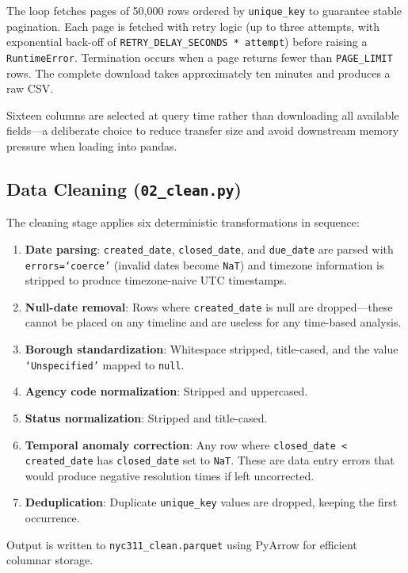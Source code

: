 The loop fetches pages of 50,000 rows ordered by \texttt{unique\_key} to guarantee stable pagination. Each page is fetched with retry logic (up to three attempts, with exponential back-off of \texttt{RETRY\_DELAY\_SECONDS * attempt}) before raising a \texttt{RuntimeError}. Termination occurs when a page returns fewer than \texttt{PAGE\_LIMIT} rows. The complete download takes approximately ten minutes and produces a raw CSV.

Sixteen columns are selected at query time rather than downloading all available fields---a deliberate choice to reduce transfer size and avoid downstream memory pressure when loading into pandas.

\subsection{Data Cleaning (\texttt{02\_clean.py})}

The cleaning stage applies six deterministic transformations in sequence:

\begin{enumerate}
  \item \textbf{Date parsing}: \texttt{created\_date}, \texttt{closed\_date}, and \texttt{due\_date} are parsed with \texttt{errors=`coerce'} (invalid dates become \texttt{NaT}) and timezone information is stripped to produce timezone-naive UTC timestamps.
  \item \textbf{Null-date removal}: Rows where \texttt{created\_date} is null are dropped---these cannot be placed on any timeline and are useless for any time-based analysis.
  \item \textbf{Borough standardization}: Whitespace stripped, title-cased, and the value \texttt{`Unspecified'} mapped to \texttt{null}.
  \item \textbf{Agency code normalization}: Stripped and uppercased.
  \item \textbf{Status normalization}: Stripped and title-cased.
  \item \textbf{Temporal anomaly correction}: Any row where \texttt{closed\_date < created\_date} has \texttt{closed\_date} set to \texttt{NaT}. These are data entry errors that would produce negative resolution times if left uncorrected.
  \item \textbf{Deduplication}: Duplicate \texttt{unique\_key} values are dropped, keeping the first occurrence.
\end{enumerate}

Output is written to \texttt{nyc311\_clean.parquet} using PyArrow for efficient columnar storage.

